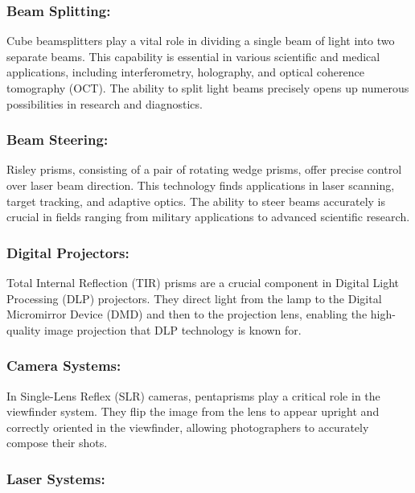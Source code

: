 \documentclass[
  a4paper,
]{book}
\begin{document}
\begin{tcolorbox}
\subsubsection{Beam Splitting:}\label{beam-splitting}

Cube beamsplitters play a vital role in dividing a single beam of light
into two separate beams. This capability is essential in various
scientific and medical applications, including interferometry,
holography, and optical coherence tomography (OCT). The ability to split
light beams precisely opens up numerous possibilities in research and
diagnostics.

\subsubsection{Beam Steering:}\label{beam-steering}

Risley prisms, consisting of a pair of rotating wedge prisms, offer
precise control over laser beam direction. This technology finds
applications in laser scanning, target tracking, and adaptive optics.
The ability to steer beams accurately is crucial in fields ranging from
military applications to advanced scientific research.

\subsubsection{Digital Projectors:}\label{digital-projectors}

Total Internal Reflection (TIR) prisms are a crucial component in
Digital Light Processing (DLP) projectors. They direct light from the
lamp to the Digital Micromirror Device (DMD) and then to the projection
lens, enabling the high-quality image projection that DLP technology is
known for.

\subsubsection{Camera Systems:}\label{camera-systems}

In Single-Lens Reflex (SLR) cameras, pentaprisms play a critical role in
the viewfinder system. They flip the image from the lens to appear
upright and correctly oriented in the viewfinder, allowing photographers
to accurately compose their shots.

\subsubsection{Laser Systems:}\label{laser-systems}


\end{tcolorbox}
\end{document}
